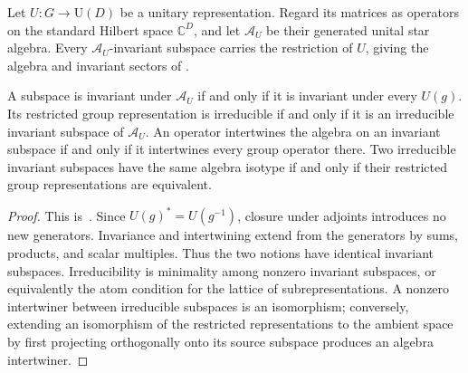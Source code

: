 \begin{definition}
    \label{def:peps_unitary_representation_algebra}
    \leanok
    Let $U:G\to\mathrm U(D)$ be a unitary representation. Regard its
    matrices as operators on the standard Hilbert space $\mathbb C^D$,
    and let $\mathcal A_U$ be their generated unital star algebra.
    Every $\mathcal A_U$-invariant subspace carries the restriction of $U$,
    giving the algebra and invariant sectors of
    \cite[Section~4.1]{Schuch2010PEPS}.
\end{definition}

\begin{lemma}
    \label{thm:peps_unitary_representation_algebra}
    \leanok
    A subspace is invariant under $\mathcal A_U$ if and only if it is
    invariant under every $U(g)$. Its restricted group representation
    is irreducible if and only if it is an irreducible invariant subspace
    of $\mathcal A_U$. An operator intertwines the algebra on an invariant
    subspace if and only if it intertwines every group operator there.
    Two irreducible invariant subspaces have the same algebra isotype
    if and only if their restricted group representations are equivalent.
\end{lemma}
\begin{proof}\leanok
    This is~\cite[``Group and algebra invariant
        subspaces'']{QICLean2026Blueprint}.
    Since $U(g)^*=U(g^{-1})$, closure under adjoints introduces no new
    generators. Invariance and intertwining extend from the generators
    by sums, products, and scalar multiples. Thus the two notions have
    identical invariant subspaces. Irreducibility is minimality among
    nonzero invariant subspaces, or equivalently the atom condition for
    the lattice of subrepresentations. A nonzero intertwiner between
    irreducible subspaces is an isomorphism; conversely, extending an
    isomorphism of the restricted representations to the ambient space
    by first projecting orthogonally onto its source subspace produces an
    algebra intertwiner.
\end{proof}

